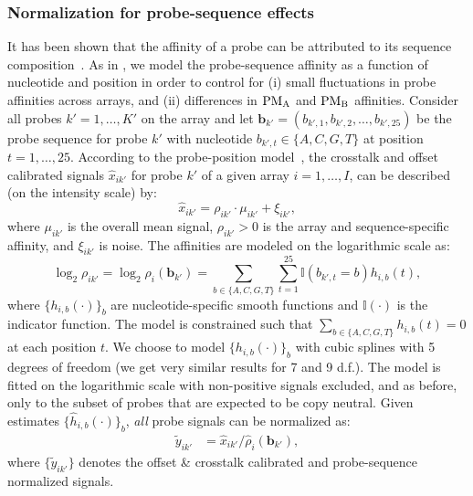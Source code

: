 \documentclass{bioinfo}
\newcommand{\PMA}{\ensuremath{\textnormal{PM}_\textnormal{A}}\xspace}
\newcommand{\PMB}{\ensuremath{\textnormal{PM}_\textnormal{B}}\xspace}
\newcommand{\bb}{\mathbf{b}\xspace}
\newcommand{\II}{\mathbb{I}\xspace}
\begin{document}
\subsubsection{Normalization for probe-sequence effects}
\label{secModelBPN}
It has been shown that the affinity of a probe can be attributed to its sequence composition~\citep{BinderH_etal_2004a, ZhangL_etal_2007, CarvalhoB_etal_2007}.
As in \citet{CarvalhoB_etal_2007}, we model the probe-sequence affinity as a function of nucleotide and position in order to control for (i) small fluctuations in probe affinities across arrays, and (ii) differences in \PMA and \PMB affinities. 
Consider all probes $k'=1,\ldots,K'$ on the array and let $\bb_{k'} = (b_{k',1},b_{k',2},\ldots,b_{k',25})$ be the probe sequence for probe $k'$ with nucleotide $b_{k',t} \in \{A,C,G,T\}$ at position $t=1,\ldots,25$.
According to the probe-position model~\citep{CarvalhoB_etal_2007}, the crosstalk and offset calibrated signals $\hat{x}_{ik'}$ for probe $k'$ of a given array $i=1,\ldots,I$, can be described (on the intensity scale) by:
\begin{equation}
  \hat{x}_{ik'} = \rho_{ik'} \cdot \mu_{ik'} + \xi_{ik'},
  \label{eqnBPNi}
\end{equation}
where $\mu_{ik'}$ is the overall mean signal, $\rho_{ik'} > 0$ is the array and sequence-specific affinity, and $\xi_{ik'}$ is noise.  The affinities are modeled on the logarithmic scale as:
\begin{equation}
  \log_2 \rho_{ik'} = \log_2 \rho_{i}(\bb_{k'}) 
    = \sum_{b \in \{A,C,G,T\}} \sum_{t=1}^{25} \II(b_{k',t}=b)h_{i,b}(t),
  \label{eqnBPNii}
\end{equation}
where $\{h_{i,b}(\cdot)\}_b$ are nucleotide-specific smooth functions and $\II(\cdot)$ is the indicator function.  The model is constrained such that $\sum_{b \in \{A,C,G,T\}} h_{i,b}(t) = 0$ at each position $t$.
We choose to model $\{h_{i,b}(\cdot)\}_b$ with cubic splines with 5 degrees of freedom (we get very similar results for 7 and 9 d.f.).  The model is fitted on the logarithmic scale with non-positive signals excluded, and as before, only to the subset of probes that are expected to be copy neutral.
Given estimates $\{\hat{h}_{i,b}(\cdot)\}_b$, \emph{all} probe signals can be normalized as:
\begin{align}
  \tilde{y}_{ik'} &= \hat{x}_{ik'} / \hat{\rho}_{i}(\bb_{k'}),
  \label{eqnBPNiii}
\end{align}
where $\{\tilde{y}_{ik'}\}$ denotes the offset \& crosstalk calibrated and probe-sequence normalized signals. %
\end{document}
